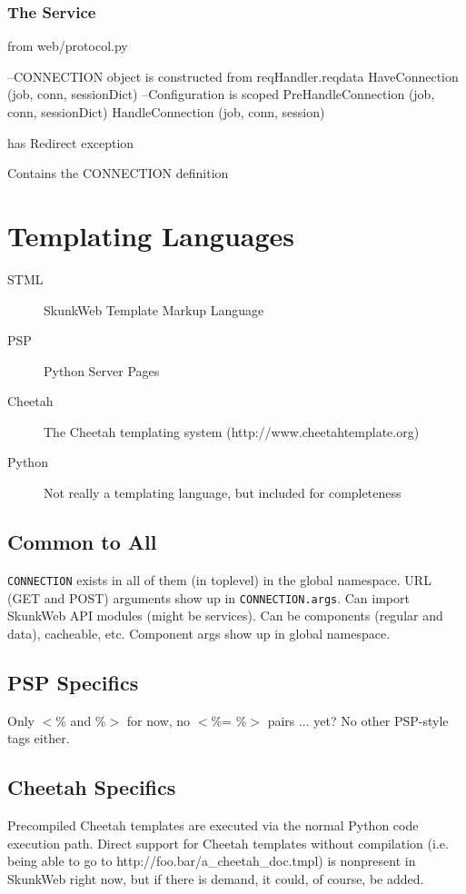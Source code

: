 \documentclass{manual}
\begin{document}
\subsection{The  Service}

from web/protocol.py

--CONNECTION object is constructed from reqHandler.reqdata
HaveConnection (job, conn, sessionDict)
--Configuration is scoped
PreHandleConnection (job, conn, sessionDict)
HandleConnection (job, conn, session)

has Redirect exception

Contains the CONNECTION definition

\chapter{Templating Languages}
\begin{description}
\item[STML] SkunkWeb Template Markup Language
\item[PSP] Python Server Pages
\item[Cheetah] The Cheetah templating system (http://www.cheetahtemplate.org)
\item[Python] Not really a templating language, but included for
completeness
\end{description}

\section{Common to All}
\texttt{CONNECTION} exists in all of them (in toplevel) in the global
namespace.  URL (GET and POST) arguments show up in
\texttt{CONNECTION.args}.  Can import SkunkWeb API modules (might be
services).  Can be components (regular and data), cacheable, etc.
Component args show up in global namespace.

\section{PSP Specifics}

Only $<$\% and \%$>$ for now, no $<$\%= \%$>$ pairs ... yet?  No other
PSP-style tags either.

\section{Cheetah Specifics}

Precompiled Cheetah templates are executed via the normal Python code
execution path.  Direct support for Cheetah templates without
compilation (i.e. being able to go to
http://foo.bar/a_cheetah_doc.tmpl) is nonpresent in SkunkWeb right
now, but if there is demand, it could, of course, be added.
\end{document}
